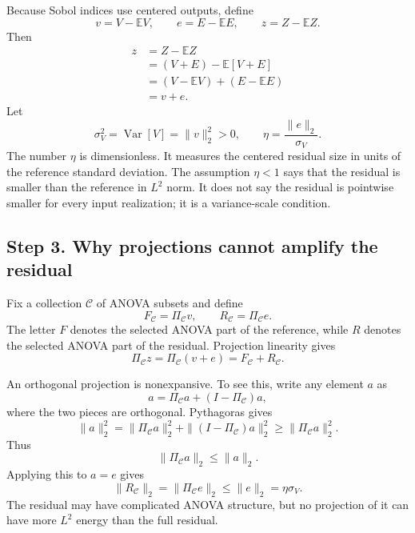 \documentclass[11pt,letterpaper]{article}
\DeclareMathOperator{\Var}{Var}
\newcommand{\E}{\mathbb{E}}
\theoremstyle{remark}
\begin{document}
Because Sobol indices use centered outputs, define
\begin{equation}
  v=V-\E V,
  \qquad
  e=E-\E E,
  \qquad
  z=Z-\E Z.
\end{equation}
Then
\begin{align}
  z
  &=Z-\E Z \\
  &=(V+E)-\E[V+E] \\
  &=(V-\E V)+(E-\E E) \\
  &=v+e.
\end{align}
Let
\begin{equation}
  \sigma_V^2=\Var[V]=\|v\|_2^2>0,
  \qquad
  \eta=\frac{\|e\|_2}{\sigma_V}.
\end{equation}
The number $\eta$ is dimensionless. It measures the centered residual size in
units of the reference standard deviation. The assumption $\eta<1$ says that the
residual is smaller than the reference in $L^2$ norm. It does not say the
residual is pointwise smaller for every input realization; it is a variance-scale
condition.

\subsection*{Step 3. Why projections cannot amplify the residual}

Fix a collection $\mathscr C$ of ANOVA subsets and define
\begin{equation}
  F_{\mathscr C}=\Pi_{\mathscr C}v,
  \qquad
  R_{\mathscr C}=\Pi_{\mathscr C}e.
\end{equation}
The letter $F$ denotes the selected ANOVA part of the reference, while $R$
denotes the selected ANOVA part of the residual. Projection linearity gives
\begin{equation}
  \Pi_{\mathscr C}z
  =\Pi_{\mathscr C}(v+e)
  =F_{\mathscr C}+R_{\mathscr C}.
\end{equation}

An orthogonal projection is nonexpansive. To see this, write any element $a$ as
\begin{equation}
  a=\Pi_{\mathscr C}a+(I-\Pi_{\mathscr C})a,
\end{equation}
where the two pieces are orthogonal. Pythagoras gives
\begin{equation}
  \|a\|_2^2
  =\|\Pi_{\mathscr C}a\|_2^2+\|(I-\Pi_{\mathscr C})a\|_2^2
  \geq \|\Pi_{\mathscr C}a\|_2^2.
\end{equation}
Thus
\begin{equation}
  \|\Pi_{\mathscr C}a\|_2\leq\|a\|_2.
\end{equation}
Applying this to $a=e$ gives
\begin{equation}
  \|R_{\mathscr C}\|_2
  =\|\Pi_{\mathscr C}e\|_2
  \leq\|e\|_2
  =\eta\sigma_V.
\end{equation}
The residual may have complicated ANOVA structure, but no projection of it can
have more $L^2$ energy than the full residual.
\end{document}
